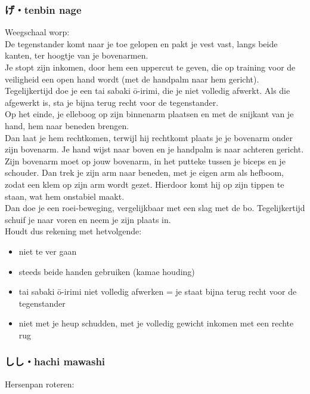 \subsubsection{げ・tenbin nage}
Weegschaal worp:\\
De tegenstander komt naar je toe gelopen en pakt je vest vast, langs beide kanten, ter hoogtje van je bovenarmen.\\
Je stopt zijn inkomen, door hem een uppercut te geven, die op training voor de veiligheid een open hand wordt (met de handpalm naar hem gericht).\\
Tegelijkertijd doe je een tai sabaki \={o}-irimi, die je niet volledig afwerkt. Als die afgewerkt is, sta je bijna terug recht voor de tegenstander.\\
Op het einde, je elleboog op zijn binnenarm plaatsen en met de snijkant van je hand, hem naar beneden brengen.\\
Dan laat je hem rechtkomen, terwijl hij rechtkomt plaats je je bovenarm onder zijn bovenarm. Je hand wijst naar boven en je handpalm is naar achteren gericht. Zijn bovenarm moet op jouw bovenarm, in het putteke tussen je biceps en je schouder. Dan trek je zijn arm naar beneden, met je eigen arm als hefboom, zodat een klem op zijn arm wordt gezet. Hierdoor komt hij op zijn tippen te staan, wat hem onstabiel maakt.\\
Dan doe je een roei-beweging, vergelijkbaar met een slag met de bo. Tegelijkertijd schuif je naar voren en neem je zijn plaats in.\\

Houdt dus rekening met hetvolgende:
\begin{itemize}
    \item niet te ver gaan
    \item steeds beide handen gebruiken (kamae houding)
    \item tai sabaki \={o}-irimi niet volledig afwerken = je staat bijna terug recht voor de tegenstander
    \item niet met je heup schudden, met je volledig gewicht inkomen met een rechte rug
\end{itemize}

\subsubsection{しし・hachi mawashi}
Hersenpan roteren:\\

